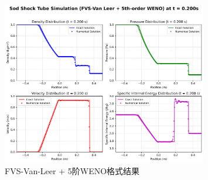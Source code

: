 \documentclass[12pt,a4paper]{article}
\begin{document}
\begin{figure}[!htbp]
    \centering
    \includegraphics[width=0.8\textwidth]{Sod_Shock_FVS-Van Leer + 5th-order WENO_t_0p200s.png}
    \caption{FVS-Van-Leer + 5阶WENO格式结果}
\end{figure}
\end{document}
